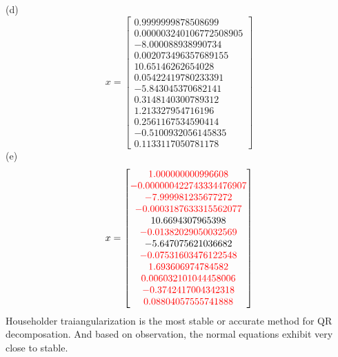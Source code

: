 \documentclass{article}
\begin{document}
(d)\[x=\begin{bmatrix} 0.9999999878508699\\ 0.000003240106772508905\\ -8.000088938990734\\ 0.002073496357689155\\ 10.65146262654028\\ 0.05422419780233391\\ -5.843045370682141\\ 0.3148140300789312\\ 1.213327954716196\\ 0.2561167534590414\\ -0.5100932056145835\\ 0.1133117050781178 \end{bmatrix}\]
(e)\[x=\begin{bmatrix}\textcolor{red}{1.000000000996608}\\ \textcolor{red}{-0.000000422743334476907}\\ \textcolor{red}{-7.999981235677272}\\ \textcolor{red}{-0.0003187633315562077}\\ 10.6694307965398\\ \textcolor{red}{-0.01382029050032569}\\ -5.647075621036682\\ \textcolor{red}{-0.07531603476122548}\\ \textcolor{red}{1.693606974784582}\\ \textcolor{red}{0.006032101044458006}\\ \textcolor{red}{-0.3742417004342318}\\ \textcolor{red}{0.08804057555741888} \end{bmatrix}
\]
Householder traiangularization is the most stable or accurate method for QR decomposation. And based on observation, the normal equations exhibit very close to stable.
\end{document}
